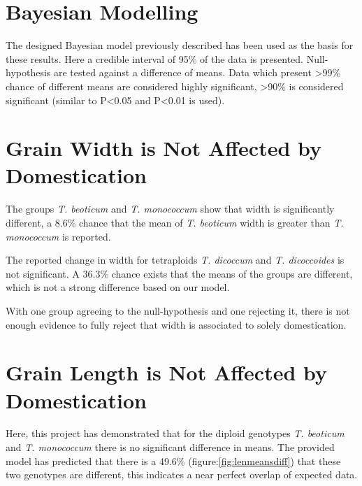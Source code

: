 \documentclass[11pt]{report}
\begin{document}
\section{Bayesian Modelling}
\label{sec:orgb180786}
The designed Bayesian model previously described has been used as the basis for these results. Here a credible interval of 95\% of the data is presented. Null-hypothesis are tested against a difference of means. Data which present >99\% chance of different means are considered highly significant, >90\% is considered significant (similar to P<0.05 and P<0.01 is used).


\section{Grain Width is Not Affected by Domestication}
\label{sec:org702d3ac}

The groups \emph{T. beoticum} and \emph{T. monococcum} show  that width is significantly different, a 8.6\% chance that the mean of \emph{T. beoticum} width is greater than \emph{T. monococcum} is reported.

The reported change in width for tetraploids \emph{T. dicoccum} and \emph{T. dicoccoides} is not significant. A 36.3\% chance exists that the means of the groups are different, which is not a strong difference based on our model.

With one group agreeing to the null-hypothesis and one rejecting it, there is not enough evidence to fully reject that width is associated to solely domestication.

\clearpage
\section{Grain Length is Not Affected by Domestication}
\label{sec:orgadbb9e4}

Here, this project has demonstrated that for the diploid genotypes \emph{T. beoticum} and \emph{T. monococcum} there is no significant difference in means. The provided model has predicted that there is a 49.6\% (figure:\ref{fig:lenmeansdiff}) that these two genotypes are different, this indicates a near perfect overlap of expected data.
\end{document}
